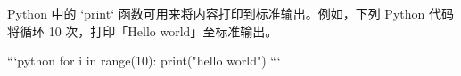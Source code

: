 \documentclass[UTF8]{ctexart}
\begin{document}
\begin{markdown}
Python 中的 `print` 函数可用来将内容打印到标准输出。例如，下列 Python 代码将循环 10 次，打印「Hello world」至标准输出。

```python
for i in range(10):
    print("hello world")
```
\end{markdown}
\end{document}
